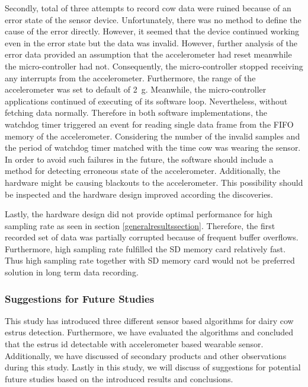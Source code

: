 \documentclass[english,12pt,a4paper,pdftex,elec,utf8]{aaltothesis}
\begin{document}
Secondly, total of three attempts to record cow data were ruined because of an error state of the sensor device. Unfortunately, there was no method to define the cause of the error directly. However, it seemed that the device continued working even in the error state but the data was invalid. However, further analysis of the error data provided an assumption that the accelerometer had reset meanwhile the micro-controller had not. Consequently, the micro-controller stopped receiving any interrupts from the accelerometer. Furthermore, the range of the accelerometer was set to default of \SI{2}{\gram}. Meanwhile, the micro-controller applications continued of executing of its software loop. Nevertheless, without fetching data normally. Therefore in both software implementations, the watchdog timer triggered an event for reading single data frame from the FIFO memory of the accelerometer. Considering the number of the invalid samples and the period of watchdog timer matched with the time cow was wearing the sensor. In order to avoid such failures in the future, the software should include a method for detecting erroneous state of the accelerometer. Additionally, the hardware might be causing blackouts to the accelerometer. This possibility should be inspected and the hardware design improved according the discoveries.

Lastly, the hardware design did not provide optimal performance for high sampling rate as seen in section \ref{generalresultssection}. Therefore, the first recorded set of data was partially corrupted because of frequent buffer overflows. Furthermore, high sampling rate fulfilled the SD memory card relatively fast. Thus high sampling rate together with SD memory card would not be preferred solution in long term data recording. 



\subsubsection{Suggestions for Future Studies}

This study has introduced three different sensor based algorithms for dairy cow estrus detection. Furthermore, we have evaluated the algorithms and concluded that the estrus id detectable with accelerometer based wearable sensor. Additionally, we have discussed of secondary products and other observations during this study. Lastly in this study, we will discuss of suggestions for potential future studies based on the introduced results and conclusions.
\end{document}
